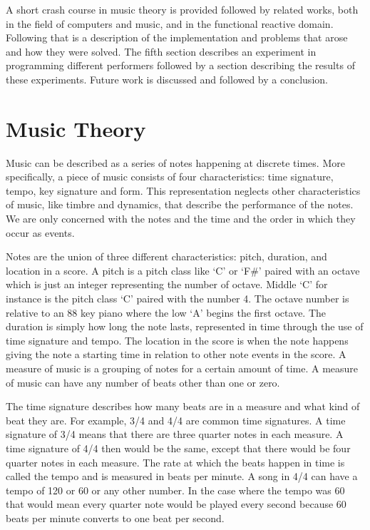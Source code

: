 \documentclass[12pt]{ucthesis}
\begin{document}
A short crash course in music theory is provided followed by related works, both in the field of computers and music, and in the functional reactive domain. Following that is a description of the implementation and problems that arose and how they were solved. The fifth section describes an experiment in programming different performers followed by a section describing the results of these experiments. Future work is discussed and followed by a conclusion.

\chapter{Music Theory}
\label{music-theory}
Music can be described as a series of notes happening at discrete times. More specifically, a piece of music consists of four characteristics: time signature, tempo, key signature and form. This representation neglects other characteristics of music, like timbre and dynamics, that describe the performance of the notes. We are only concerned with the notes and the time and the order in which they occur as events.

Notes are the union of three different characteristics: pitch, duration, and location in a score. A pitch is a pitch class like `C' or `F\#' paired with an octave which is just an integer representing the number of octave. Middle `C' for instance is the pitch class `C' paired with the number 4. The octave number is relative to an 88 key piano where the low `A' begins the first octave.  The duration is simply how long the note lasts, represented in time through the use of time signature and tempo. The location in the score is when the note happens giving the note a starting time in relation to other note events in the score. A measure of music is a grouping of notes for a certain amount of time. A measure of music can have any number of beats other than one or zero.

The time signature describes how many beats are in a measure and what kind of beat they are. For example, 3/4 and 4/4 are common time signatures. A time signature of 3/4 means that there are three quarter notes in each measure. A time signature of 4/4 then would be the same, except that there would be four quarter notes in each measure. The rate at which the beats happen in time is called the tempo and is measured in beats per minute. A song in 4/4 can have a tempo of 120 or 60 or any other number. In the case where the tempo was 60 that would mean every quarter note would be played every second because 60 beats per minute converts to one beat per second. 
\end{document}
